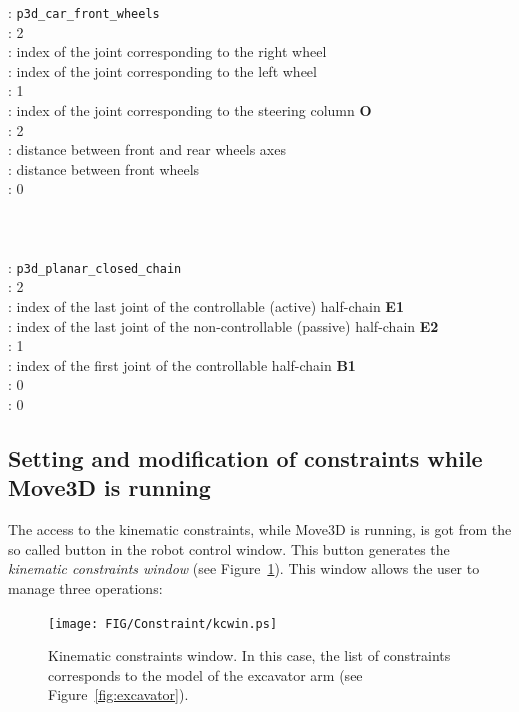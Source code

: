 \begin{tabbing}
\> \>: {\tt p3d\_car\_front\_wheels}\\
\> \>: 2\\
\> \>: index of the joint corresponding to the right wheel\\
\> \>: index of the joint corresponding to the left wheel\\
\> \>: 1\\
\> \>: index of the joint corresponding to the steering
column {\bf O}\\
\> \>: 2\\
\> \>: distance between front and rear wheels axes\\
\> \>: distance between front wheels\\
\> \>: 0\\
\>\>\\
 \\
\>\>\\
\> \>: {\tt p3d\_planar\_closed\_chain}\\
\> \>: 2\\
\> \>: index of the last joint of the controllable (active) half-chain {\bf E1}\\
\> \>: index of the last joint of the non-controllable (passive) half-chain {\bf E2}\\
\> \>: 1\\
\> \>: index of the first joint of the controllable half-chain {\bf B1}\\
\> \>: 0\\
\> \>: 0\\
\end{tabbing}


\subsection*{Setting and modification of constraints while Move3D is running}

The access to the kinematic constraints, while Move3D is running, is
got from the so called button in the robot control window. This button 
generates the {\em kinematic constraints window} (see
Figure~\ref{fig:kcwin}). This window allows the user to manage
three operations:

\begin{figure}[b!]
\begin{center}
  \texttt{[image: FIG/Constraint/kcwin.ps]}
\end{center}
\caption{\label{fig:kcwin} Kinematic constraints window. In this
  case, the list of constraints corresponds to the model of the
  excavator arm (see Figure~\ref{fig:excavator}).}
\end{figure}

